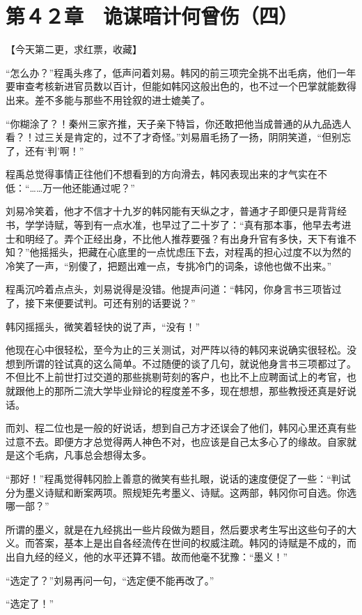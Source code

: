 \section{第４２章　诡谋暗计何曾伤（四）}

【今天第二更，求红票，收藏】

“怎么办？”程禹头疼了，低声问着刘易。韩冈的前三项完全挑不出毛病，他们一年要审查考核新进官员数以百计，但能如韩冈这般出色的，也不过一个巴掌就能数得出来。差不多能与那些不用铨叙的进士媲美了。

“你糊涂了？！秦州三家齐推，天子亲下特旨，你还敢把他当成普通的从九品选人看？！过三关是肯定的，过不了才奇怪。”刘易眉毛扬了一扬，阴阴笑道，“但别忘了，还有‘判’啊！”

程禹总觉得事情正往他们不想看到的方向滑去，韩冈表现出来的才气实在不低：“……万一他还能通过呢？”

刘易冷笑着，他才不信才十九岁的韩冈能有天纵之才，普通才子即便只是背背经书，学学诗赋，等到有一点水准，也早过了二十岁了：“真有那本事，他早去考进士和明经了。弄个正经出身，不比他人推荐要强？有出身升官有多快，天下有谁不知？”他摇摇头，把藏在心底里的一点忧虑压下去，对程禹的担心过度不以为然的冷笑了一声，“别傻了，把题出难一点，专挑冷门的词条，谅他也做不出来。”

程禹沉吟着点点头，刘易说得是没错。他提声问道：“韩冈，你身言书三项皆过了，接下来便要试判。可还有别的话要说？”

韩冈摇摇头，微笑着轻快的说了声，“没有！”

他现在心中很轻松，至今为止的三关测试，对严阵以待的韩冈来说确实很轻松。没想到所谓的铨试真的这么简单。不过随便的谈了几句，就说他身言书三项都过了。不但比不上前世打过交道的那些挑剔苛刻的客户，也比不上应聘面试上的考官，也就跟他上的那所二流大学毕业辩论的程度差不多，现在想想，那些教授还真是好说话。

而刘、程二位也是一般的好说话，想到自己方才还误会了他们，韩冈心里还真有些过意不去。即便方才总觉得两人神色不对，也应该是自己太多心了的缘故。自家就是这个毛病，凡事总会想得太多。

“那好！”程禹觉得韩冈脸上善意的微笑有些扎眼，说话的速度便促了一些：“判试分为墨义诗赋和断案两项。照规矩先考墨义、诗赋。这两部，韩冈你可自选。你选哪一部？”

所谓的墨义，就是在九经挑出一些片段做为题目，然后要求考生写出这些句子的大义。而答案，基本上是出自各经流传在世间的权威注疏。韩冈的诗赋是不成的，而出自九经的经义，他的水平还算不错。故而他毫不犹豫：“墨义！”

“选定了？”刘易再问一句，“选定便不能再改了。”

“选定了！”

